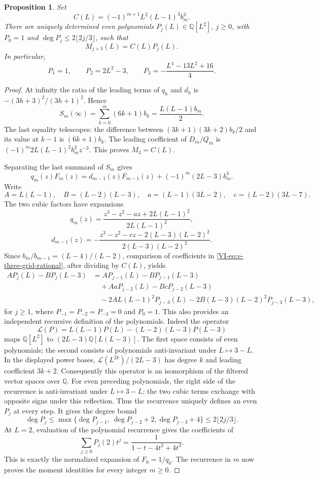 \documentclass[11pt,letterpaper]{article}
\newtheorem{proposition}[theorem]{Proposition}
\numberwithin{equation}{section}
\begin{document}
\begin{proposition}\label{VI-prop:e-three-grid-moments}
Set
\[
 C(L)=(-1)^{m+1}L^2(L-1)^3b_m^3.
\]
There are uniquely determined even polynomials $P_j(L)\in\mathbb Q[L^2]$,
$j\ge0$, with $P_0=1$ and $\deg P_j\le2\lfloor2j/3\rfloor$, such that
\[
 M_{j+3}(L)=C(L)P_j(L).
\]
In particular,
\[
 P_1=1,\qquad P_2=2L^2-3,\qquad
 P_3=-\frac{L^4-13L^2+16}{4}.
\]
\end{proposition}
\begin{proof}
At infinity the ratio of the leading terms of $q_h$ and $d_h$ is
$-(3h+3)^2/(3h+1)^2$. Hence
\[
 S_m(\infty)=\sum_{k=0}^m(6k+1)b_k
 =\frac{L(L-1)b_m}{2}.
\]
The last equality telescopes: the difference between
$(3k+1)(3k+2)b_k/2$ and its value at $k-1$ is $(6k+1)b_k$.
The leading coefficient of $D_m/Q_m$ is
$(-1)^m2L(L-1)^2b_m^2z^{-3}$. This proves $M_3=C(L)$.

Separating the last summand of $S_m$ gives
\begin{equation}\label{VI-eq:e-three-grid-rational}
 q_m(z)F_m(z)=d_{m-1}(z)F_{m-1}(z)
                         +(-1)^m(2L-3)b_m^3.
\end{equation}
Write
\[
 A=L(L-1),\quad B=(L-2)(L-3),\quad
 a=(L-1)(3L-2),\quad c=(L-2)(3L-7).
\]
The two cubic factors have expansions
\[
 q_m(z)=\frac{z^3-z^2-az+2L(L-1)^2}{2L(L-1)^2},
\]
\[
 d_{m-1}(z)=
 -\frac{z^3-z^2-cz-2(L-3)(L-2)^2}{2(L-3)(L-2)^2}.
\]
Since $b_m/b_{m-1}=(L-4)/(L-2)$, comparison of coefficients in
\eqref{VI-eq:e-three-grid-rational}, after dividing by $C(L)$, yields
\begin{align*}
 A P_j(L)-B P_j(L-3)
 &=A P_{j-1}(L)-B P_{j-1}(L-3)\\
 &\quad+A a P_{j-2}(L)-B c P_{j-2}(L-3)\\
 &\quad-2A L(L-1)^2P_{j-3}(L)
        -2B(L-3)(L-2)^2P_{j-3}(L-3),
\end{align*}
for $j\ge1$, where $P_{-1}=P_{-2}=P_{-3}=0$ and $P_0=1$.
This also provides an independent recursive definition of the
polynomials. Indeed the operator
\[
 \mathcal L(P)=L(L-1)P(L)-(L-2)(L-3)P(L-3)
\]
maps $\mathbb Q[L^2]$ to
$(2L-3)\mathbb Q[L(L-3)]$. The first space consists of even
polynomials; the second consists of polynomials anti-invariant
under $L\mapsto3-L$. In the displayed power bases,
$\mathcal L(L^{2k})/(2L-3)$ has degree $k$ and leading coefficient
$3k+2$. Consequently this operator is an isomorphism of the filtered
vector spaces over $\mathbb Q$.
For even preceding polynomials, the right side of the recurrence is
anti-invariant under $L\mapsto3-L$; the two cubic terms exchange
with opposite signs under this reflection. Thus the recurrence
uniquely defines an even $P_j$ at every step. It gives the degree bound
\[
 \deg P_j\le\max\{\deg P_{j-1},\ \deg P_{j-2}+2,
                                    \deg P_{j-3}+4\}
 \le2\lfloor2j/3\rfloor.
\]
At $L=2$, evaluation of the polynomial recurrence gives the
coefficients of
\[
 \sum_{j\ge0}P_j(2)t^j=\frac1{1-t-4t^2+4t^3}.
\]
This is exactly the normalized expansion of $F_0=1/q_0$.
The recurrence in $m$ now proves the moment identities for every
integer $m\ge0$.
\end{proof}
\end{document}

